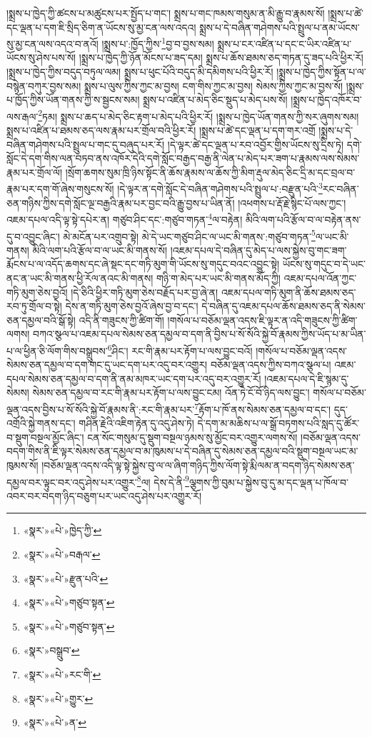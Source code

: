 །སྨྲས་པ་ཁྱེད་ཀྱི་ཚངས་པ་མཚུངས་པར་སྤྱོད་པ་གང་། སྨྲས་པ་གང་ཁམས་གསུམ་ན་མི་རྒྱུ་བ་རྣམས་སོ། །སྨྲས་པ་ཚེ་དང་ལྡན་པ་དག་ཇི་སྲིད་ཅིག་ན་ཡོངས་སུ་མྱ་ངན་ལས་འདའ། སྨྲས་པ་དེ་བཞིན་གཤེགས་པའི་སྤྲུལ་པ་ནམ་ཡོངས་སུ་མྱ་ངན་ལས་འདའ་བ་ནའོ། །སྨྲས་པ་:ཁྱོད་ཀྱིས་\footnote{«སྣར་»«པེ་»ཁྱེད་ཀྱི་}བྱ་བ་བྱས་སམ། སྨྲས་པ་ངར་འཛིན་པ་དང་ང་ཡིར་འཛིན་པ་ཡོངས་སུ་ཤེས་པས་སོ། །སྨྲས་པ་ཁྱེད་ཀྱི་ཉོན་མོངས་པ་ཟད་དམ། སྨྲས་པ་ཆོས་ཐམས་ཅད་གཏན་དུ་ཟད་པའི་ཕྱིར་རོ། །སྨྲས་པ་ཁྱེད་ཀྱིས་བདུད་བཏུལ་ལམ། སྨྲས་པ་ཕུང་པོའི་བདུད་མི་དམིགས་པའི་ཕྱིར་རོ། །སྨྲས་པ་ཁྱེད་ཀྱིས་སྟོན་པ་ལ་བསྙེན་བཀུར་བྱས་སམ། སྨྲས་པ་ལུས་ཀྱིས་ཀྱང་མ་བྱས། ངག་གིས་ཀྱང་མ་བྱས། སེམས་ཀྱིས་ཀྱང་མ་བྱས་སོ། །སྨྲས་པ་ཁྱོད་ཀྱིས་ཡོན་གནས་ཀྱི་ས་སྦྱངས་སམ། སྨྲས་པ་འཛིན་པ་མེད་ཅིང་སྡུད་པ་མེད་པས་སོ། །སྨྲས་པ་ཁྱེད་འཁོར་བ་ལས་རྒལ་\footnote{«སྣར་»«པེ་»བརྒལ་}ཏམ། སྨྲས་པ་ཆད་པ་མེད་ཅིང་རྟག་པ་མེད་པའི་ཕྱིར་རོ། །སྨྲས་པ་ཁྱེད་ཡོན་གནས་ཀྱི་སར་ཞུགས་སམ། སྨྲས་པ་འཛིན་པ་ཐམས་ཅད་ལས་རྣམ་པར་གྲོལ་བའི་ཕྱིར་རོ། །སྨྲས་པ་ཚེ་དང་ལྡན་པ་དག་གར་འགྲོ །སྨྲས་པ་དེ་བཞིན་གཤེགས་པའི་སྤྲུལ་པ་གང་དུ་བཞུད་པར་རོ། །དེ་ལྟར་ཚེ་དང་ལྡན་པ་རབ་འབྱོར་གྱིས་ཡོངས་སུ་དྲིས་ཏེ། དགེ་སློང་དེ་དག་གིས་ལན་བཏབ་ནས་འཁོར་དེའི་དགེ་སློང་བརྒྱད་བརྒྱ་ནི་ལེན་པ་མེད་པར་ཟག་པ་རྣམས་ལས་སེམས་རྣམ་པར་གྲོལ་ལོ། །སྲོག་ཆགས་སུམ་ཁྲི་ཉིས་སྟོང་ནི་ཆོས་རྣམས་ལ་ཆོས་ཀྱི་མིག་རྡུལ་མེད་ཅིང་དྲི་མ་དང་བྲལ་བ་རྣམ་པར་དག་གོ་ཞེས་གསུངས་སོ། །དེ་ལྟར་ན་དགེ་སློང་དེ་བཞིན་གཤེགས་པའི་སྤྲུལ་པ་:བརྫུན་པའི་\footnote{«སྣར་»«པེ་»རྫུན་པའི་}རང་བཞིན་ཅན་གཉིས་ཀྱིས་དགེ་སློང་ལྔ་བརྒྱའི་རྣམ་པར་བྱང་བའི་རྒྱུ་བྱས་པ་ཡིན་ནོ། །འཕགས་པ་རྡོ་རྗེ་སྙིང་པོ་ལས་ཀྱང་། འཇམ་དཔལ་འདི་ལྟ་སྟེ་དཔེར་ན། གཙུབ་ཤིང་དང་:གཙུབ་གཏན་\footnote{«སྣར་»«པེ་»གཙུབ་སྟན་}ལ་བརྟེན། མིའི་ལག་པའི་རྩོལ་བ་ལ་བརྟེན་ནས་དུ་བ་འབྱུང་ཞིང་། མེ་མངོན་པར་འགྲུབ་སྟེ། མེ་དེ་ཡང་གཙུབ་ཤིང་ལ་ཡང་མི་གནས་:གཙུབ་གཏན་\footnote{«སྣར་»«པེ་»གཙུབ་སྟན་}ལ་ཡང་མི་གནས། མིའི་ལག་པའི་རྩོལ་བ་ལ་ཡང་མི་གནས་སོ། །འཇམ་དཔལ་དེ་བཞིན་དུ་མེད་པ་ལས་སྐྱེས་བུ་གང་ཟག་རྨོངས་པ་ལ་འདོད་ཆགས་དང་ཞེ་སྡང་དང་གཏི་མུག་གི་ཡོངས་སུ་གདུང་བའང་འབྱུང་སྟེ། ཡོངས་སུ་གདུང་བ་དེ་ཡང་ནང་ན་ཡང་མི་གནས་ཕྱི་རོལ་ནའང་མི་གནས། གཉི་ག་མེད་པར་ཡང་མི་གནས་མོད་ཀྱི། འཇམ་དཔལ་འོན་ཀྱང་གཏི་མུག་ཅེས་བྱའོ། །དེ་ཅིའི་ཕྱིར་གཏི་མུག་ཅེས་བརྗོད་པར་བྱ་ཞེ་ན། འཇམ་དཔལ་གཏི་མུག་ནི་ཆོས་ཐམས་ཅད་རབ་ཏུ་གྲོལ་བ་སྟེ། དེས་ན་གཏི་མུག་ཅེས་བྱའོ་ཞེས་བྱ་བ་དང་། དེ་བཞིན་དུ་འཇམ་དཔལ་ཆོས་ཐམས་ཅད་ནི་སེམས་ཅན་དམྱལ་བའི་སྒོ་སྟེ། འདི་ནི་གཟུངས་ཀྱི་ཚིག་གོ། །གསོལ་པ་བཅོམ་ལྡན་འདས་ཇི་ལྟར་ན་འདི་གཟུངས་ཀྱི་ཚིག་ལགས། བཀའ་སྩལ་པ་འཇམ་དཔལ་སེམས་ཅན་དམྱལ་བ་དག་ནི་བྱིས་པ་སོ་སོའི་སྐྱེ་བོ་རྣམས་ཀྱིས་ཡོད་པ་མ་ཡིན་པ་ལ་ཕྱིན་ཅི་ལོག་གིས་བསྒྲུབས་\footnote{«སྣར་»བསྒྲུབ་}ཤིང་། རང་གི་རྣམ་པར་རྟོག་པ་ལས་བྱུང་བའོ། །གསོལ་པ་བཅོམ་ལྡན་འདས་སེམས་ཅན་དམྱལ་བ་དག་གང་དུ་ཡང་དག་པར་འདུ་བར་འགྱུར། བཅོམ་ལྡན་འདས་ཀྱིས་བཀའ་སྩལ་པ། འཇམ་དཔལ་སེམས་ཅན་དམྱལ་བ་དག་ནི་ནམ་མཁར་ཡང་དག་པར་འདུ་བར་འགྱུར་རོ། །འཇམ་དཔལ་དེ་ཇི་སྙམ་དུ་སེམས། སེམས་ཅན་དམྱལ་བ་རང་གི་རྣམ་པར་རྟོག་པ་ལས་བྱུང་ངམ། འོན་ཏེ་ངོ་བོ་ཉིད་ལས་བྱུང་། གསོལ་པ་བཅོམ་ལྡན་འདས་བྱིས་པ་སོ་སོའི་སྐྱེ་བོ་རྣམས་ནི་:རང་གི་རྣམ་པར་\footnote{«སྣར་»«པེ་»རང་གི་}རྟོག་པ་ཁོ་ནས་སེམས་ཅན་དམྱལ་བ་དང་། དུད་འགྲོའི་སྐྱེ་གནས་དང་། གཤིན་རྗེའི་འཇིག་རྟེན་དུ་འདུ་ཤེས་ཏེ། དེ་དག་མ་མཆིས་པ་ལ་སྒྲོ་བཏགས་པའི་སླད་དུ་ཚོར་བ་སྡུག་བསྔལ་མྱོང་ཞིང་། ངན་སོང་གསུམ་དུ་སྡུག་བསྔལ་ཉམས་སུ་མྱོང་བར་འགྱུར་ལགས་སོ། །བཅོམ་ལྡན་འདས་བདག་གིས་ནི་ཇི་ལྟར་སེམས་ཅན་དམྱལ་བ་མ་ཁུམས་པ་དེ་བཞིན་དུ་སེམས་ཅན་དམྱལ་བའི་སྡུག་བསྔལ་ཡང་མ་ཁུམས་སོ། །བཅོམ་ལྡན་འདས་འདི་ལྟ་སྟེ་སྐྱེས་བུ་ལ་ལ་ཞིག་གཉིད་ཀྱིས་ལོག་སྟེ་རྨི་ལམ་ན་བདག་ཉིད་སེམས་ཅན་དམྱལ་བར་ལྟུང་བར་འདུ་ཤེས་པར་འགྱུར་\footnote{«སྣར་»«པེ་»གྱུར་}ལ། དེས་དེ་ནི་\footnote{«སྣར་»«པེ་»ན་}ལྕགས་ཀྱི་བུམ་པ་སྐྱེས་བུ་དུ་མ་དང་ལྡན་པ་ཁོལ་བ་འབར་བར་བདག་ཉིད་བཅུག་པར་ཡང་འདུ་ཤེས་པར་འགྱུར་རོ། 